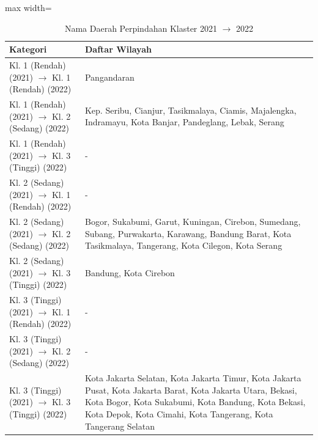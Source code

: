 \begin{table}[H]
\centering
\caption{Nama Daerah Perpindahan Klaster 2021 \(\rightarrow\) 2022} \label{tab:apptransname2021x2022}
\begin{adjustbox}{max width=\textwidth}
\begin{tabular}{|p{4cm}|p{10cm}|}
\hline
\textbf{Kategori} & \textbf{Daftar Wilayah} \\
\hline
Kl. 1 (Rendah) (2021) \(\rightarrow\) Kl. 1 (Rendah) (2022) & Pangandaran \\
\hline
Kl. 1 (Rendah) (2021) \(\rightarrow\) Kl. 2 (Sedang) (2022) & Kep. Seribu, Cianjur, Tasikmalaya, Ciamis, Majalengka, Indramayu, Kota Banjar, Pandeglang, Lebak, Serang \\
\hline
Kl. 1 (Rendah) (2021) \(\rightarrow\) Kl. 3 (Tinggi) (2022) & - \\
\hline
Kl. 2 (Sedang) (2021) \(\rightarrow\) Kl. 1 (Rendah) (2022) & - \\
\hline
Kl. 2 (Sedang) (2021) \(\rightarrow\) Kl. 2 (Sedang) (2022) & Bogor, Sukabumi, Garut, Kuningan, Cirebon, Sumedang, Subang, Purwakarta, Karawang, Bandung Barat, Kota Tasikmalaya, Tangerang, Kota Cilegon, Kota Serang \\
\hline
Kl. 2 (Sedang) (2021) \(\rightarrow\) Kl. 3 (Tinggi) (2022) & Bandung, Kota Cirebon \\
\hline
Kl. 3 (Tinggi) (2021) \(\rightarrow\) Kl. 1 (Rendah) (2022) & - \\
\hline
Kl. 3 (Tinggi) (2021) \(\rightarrow\) Kl. 2 (Sedang) (2022) & - \\
\hline
Kl. 3 (Tinggi) (2021) \(\rightarrow\) Kl. 3 (Tinggi) (2022) & Kota Jakarta Selatan, Kota Jakarta Timur, Kota Jakarta Pusat, Kota Jakarta Barat, Kota Jakarta Utara, Bekasi, Kota Bogor, Kota Sukabumi, Kota Bandung, Kota Bekasi, Kota Depok, Kota Cimahi, Kota Tangerang, Kota Tangerang Selatan \\
\hline
\end{tabular}
\end{adjustbox}
\end{table}